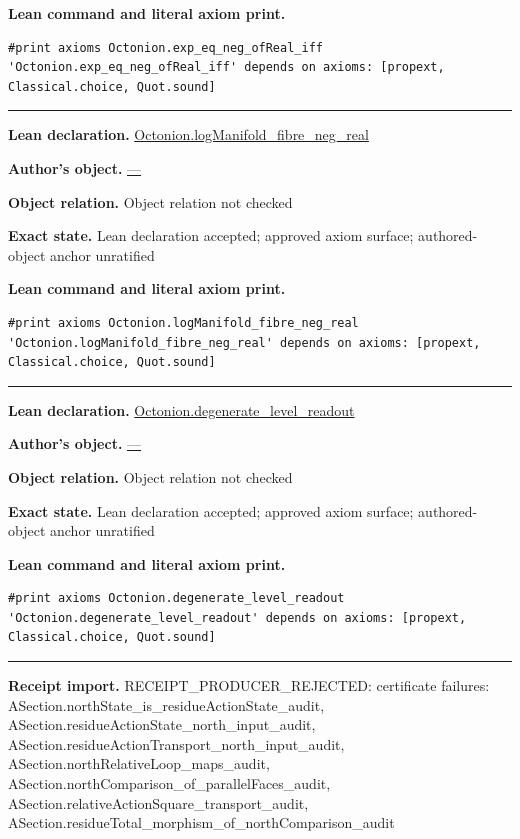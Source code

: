 \documentclass[11pt]{article}
\theoremstyle{plain}
\theoremstyle{definition}
\theoremstyle{remark}
\begin{document}
\begin{tcolorbox}
\par\smallskip\textbf{Lean command and literal axiom print.}
\begin{Verbatim}[breaklines=true,breakanywhere=true,fontsize=\small]
#print axioms Octonion.exp_eq_neg_ofReal_iff
'Octonion.exp_eq_neg_ofReal_iff' depends on axioms: [propext, Classical.choice, Quot.sound]
\end{Verbatim}
\medskip\hrule\medskip
\textbf{Lean declaration.} \url{Octonion.logManifold_fibre_neg_real}
\par\textbf{Author's object.} \url{—}
\par\textbf{Object relation.} Object relation not checked
\par\textbf{Exact state.} Lean declaration accepted; approved axiom surface; authored-object anchor unratified
\par\smallskip\textbf{Lean command and literal axiom print.}
\begin{Verbatim}[breaklines=true,breakanywhere=true,fontsize=\small]
#print axioms Octonion.logManifold_fibre_neg_real
'Octonion.logManifold_fibre_neg_real' depends on axioms: [propext, Classical.choice, Quot.sound]
\end{Verbatim}
\medskip\hrule\medskip
\textbf{Lean declaration.} \url{Octonion.degenerate_level_readout}
\par\textbf{Author's object.} \url{—}
\par\textbf{Object relation.} Object relation not checked
\par\textbf{Exact state.} Lean declaration accepted; approved axiom surface; authored-object anchor unratified
\par\smallskip\textbf{Lean command and literal axiom print.}
\begin{Verbatim}[breaklines=true,breakanywhere=true,fontsize=\small]
#print axioms Octonion.degenerate_level_readout
'Octonion.degenerate_level_readout' depends on axioms: [propext, Classical.choice, Quot.sound]
\end{Verbatim}
\medskip\hrule\medskip
\textbf{Receipt import.} \textcolor{KgtRed}{RECEIPT\_PRODUCER\_REJECTED: certificate failures: ASection.northState\_is\_residueActionState\_audit, ASection.residueActionState\_north\_input\_audit, ASection.residueActionTransport\_north\_input\_audit, ASection.northRelativeLoop\_maps\_audit, ASection.northComparison\_of\_parallelFaces\_audit, ASection.relativeActionSquare\_transport\_audit, ASection.residueTotal\_morphism\_of\_northComparison\_audit}
\end{tcolorbox}
\medskip
\end{document}
